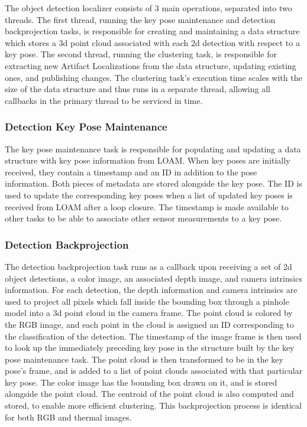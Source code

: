 The object detection localizer consists of 3 main operations, separated into two threads. The first thread, running the key pose maintenance and detection backprojection tasks, is responsible for creating and maintaining a data structure which stores a 3d point cloud associated with each 2d detection with respect to a key pose. The second thread, running the clustering task, is responsible for extracting new Artifact Localizations from the data structure, updating existing ones, and publishing changes. The clustering task's execution time scales with the size of the data structure and thus runs in a separate thread, allowing all callbacks in the primary thread to be serviced in time.

\subsubsection{Detection Key Pose Maintenance}

The key pose maintenance task is responsible for populating and updating a data structure with key pose information from LOAM. When key poses are initially received, they contain a timestamp and an ID in addition to the pose information. Both pieces of metadata are stored alongside the key pose. The ID is used to update the corresponding key poses when a list of updated key poses is received from LOAM after a loop closure. The timestamp is made available to other tasks to be able to associate other sensor measurements to a key pose.
	
\subsubsection{Detection Backprojection}
The detection backprojection task runs as a callback upon receiving a set of 2d object detections, a color image, an associated depth image, and camera intrinsics information. For each detection, the depth information and camera intrinsics are used to project all pixels which fall inside the bounding box through a pinhole model into a 3d point cloud in the camera frame. The point cloud is colored by the RGB image, and each point in the cloud is assigned an ID corresponding to the classification of the detection. The timestamp of the image frame is then used to look up the immediately preceding key pose in the structure built by the key pose maintenance task. The point cloud is then transformed to be in the key pose's frame, and is added to a list of point clouds associated with that particular key pose. The color image has the bounding box drawn on it, and is stored alongside the point cloud. The centroid of the point cloud is also computed and stored, to enable more efficient clustering. This backprojection process is identical for both RGB and thermal images.
	
